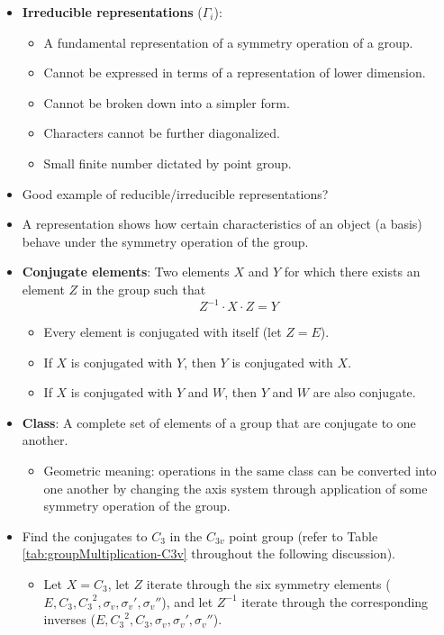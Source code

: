 \documentclass[../notes.tex]{subfiles}
\begin{document}
\begin{itemize}
    \item \textbf{Irreducible representations} ($\Gamma_i$):
    \begin{itemize}
        \item A fundamental representation of a symmetry operation of a group.
        \item Cannot be expressed in terms of a representation of lower dimension.
        \item Cannot be broken down into a simpler form.
        \item Characters cannot be further diagonalized.
        \item Small finite number dictated by point group.
    \end{itemize}
    \item Good example of reducible/irreducible representations?
    \item A representation shows how certain characteristics of an object (a basis) behave under the symmetry operation of the group.
    \item \textbf{Conjugate elements}: Two elements $X$ and $Y$ for which there exists an element $Z$ in the group such that
    \begin{equation*}
        Z^{-1}\cdot X\cdot Z = Y
    \end{equation*}
    \begin{itemize}
        \item Every element is conjugated with itself (let $Z=E$).
        \item If $X$ is conjugated with $Y$, then $Y$ is conjugated with $X$.
        \item If $X$ is conjugated with $Y$ and $W$, then $Y$ and $W$ are also conjugate.
    \end{itemize}
    \item \textbf{Class}: A complete set of elements of a group that are conjugate to one another.
    \begin{itemize}
        \item Geometric meaning: operations in the same class can be converted into one another by changing the axis system through application of some symmetry operation of the group.
    \end{itemize}
    \item Find the conjugates to $C_3$ in the $C_{3v}$ point group (refer to Table \ref{tab:groupMultiplication-C3v} throughout the following discussion).
    \begin{itemize}
        \item Let $X=C_3$, let $Z$ iterate through the six symmetry elements ($E,C_3,{C_3}^2,\sigma_v,\sigma_v',\sigma_v''$), and let $Z^{-1}$ iterate through the corresponding inverses ($E,{C_3}^2,C_3,\sigma_v,\sigma_v',\sigma_v''$).

\end{itemize}
\end{itemize}
\end{document}
